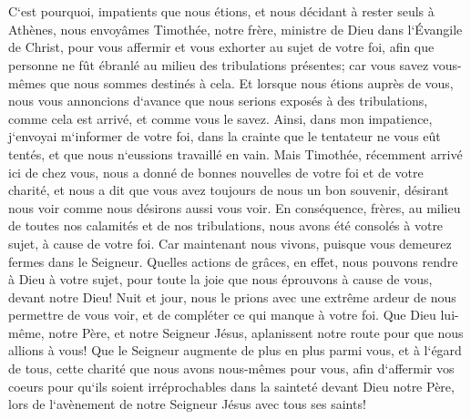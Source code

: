 \chapter{}

\verse C`est pourquoi, impatients que nous étions, et nous décidant à rester seuls à Athènes, 
\verse nous envoyâmes Timothée, notre frère, ministre de Dieu dans l`Évangile de Christ, pour vous affermir et vous exhorter au sujet de votre foi, 
\verse afin que personne ne fût ébranlé au milieu des tribulations présentes; car vous savez vous-mêmes que nous sommes destinés à cela. 
\verse Et lorsque nous étions auprès de vous, nous vous annoncions d`avance que nous serions exposés à des tribulations, comme cela est arrivé, et comme vous le savez. 
\verse Ainsi, dans mon impatience, j`envoyai m`informer de votre foi, dans la crainte que le tentateur ne vous eût tentés, et que nous n`eussions travaillé en vain. 
\verse Mais Timothée, récemment arrivé ici de chez vous, nous a donné de bonnes nouvelles de votre foi et de votre charité, et nous a dit que vous avez toujours de nous un bon souvenir, désirant nous voir comme nous désirons aussi vous voir. 
\verse En conséquence, frères, au milieu de toutes nos calamités et de nos tribulations, nous avons été consolés à votre sujet, à cause de votre foi. 
\verse Car maintenant nous vivons, puisque vous demeurez fermes dans le Seigneur. 
\verse Quelles actions de grâces, en effet, nous pouvons rendre à Dieu à votre sujet, pour toute la joie que nous éprouvons à cause de vous, devant notre Dieu! 
\verse Nuit et jour, nous le prions avec une extrême ardeur de nous permettre de vous voir, et de compléter ce qui manque à votre foi. 
\verse Que Dieu lui-même, notre Père, et notre Seigneur Jésus, aplanissent notre route pour que nous allions à vous! 
\verse Que le Seigneur augmente de plus en plus parmi vous, et à l`égard de tous, cette charité que nous avons nous-mêmes pour vous, 
\verse afin d`affermir vos coeurs pour qu`ils soient irréprochables dans la sainteté devant Dieu notre Père, lors de l`avènement de notre Seigneur Jésus avec tous ses saints! 

\chapter{}

